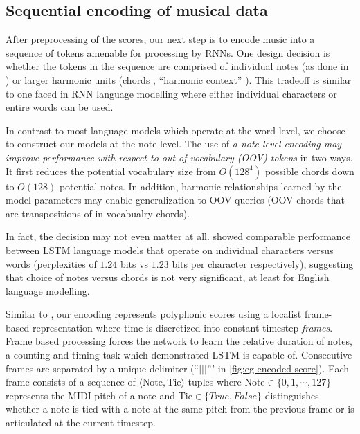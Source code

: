 \subsection{Sequential encoding of musical data}
\label{sec:sequential-encoding}


After preprocessing of the scores, our next step is to encode music into a
sequence of tokens amenable for processing by RNNs. One design decision is
whether the tokens in the sequence are comprised of individual notes (as done
in \citep{mozer1994neural,franklin2004recurrent,sturm2016music}) or larger
harmonic units (\eg chords \citep{Eck2002,Boulanger-Lewandowski2012},
``harmonic context'' \citep{Allan2005}). This tradeoff is similar to one faced
in RNN language modelling where either individual characters or entire words
can be used.

In contrast to most language models which operate at the word level, we choose
to construct our models at the note level. The use of \emph{a note-level encoding may
improve performance with respect to out-of-vocabulary (OOV) tokens} in two ways.
It first reduces the potential vocabulary size from $O(128^4)$ possible chords
down to $O(128)$ potential notes. In addition, harmonic relationships learned
by the model parameters may enable generalization to OOV queries (\eg OOV
chords that are transpositions of in-vocabualry chords).

In fact, the decision may not even matter at all. \citet{graves2013generating}
showed comparable performance between LSTM language models that operate on
individual characters versus words (perplexities of $1.24$ bits vs $1.23$ bits
per character respectively), suggesting that choice of notes versus chords is not
very significant, at least for English language modelling.

Similar to \citep{todd1989connectionist}, our encoding represents polyphonic
scores using a localist frame-based representation where time is discretized
into constant timestep \emph{frames}. Frame based processing forces the network
to learn the relative duration of notes, a counting and timing task which
\citep{gers2002learning} demonstrated LSTM is capable of. Consecutive frames
are separated by a unique delimiter (``$|||$''' in
\vref{fig:eg-encoded-score}). Each frame consists of a sequence of $\langle
\text{Note}, \text{Tie} \rangle$ tuples where $\text{Note} \in
\{0,1,\cdots,127\}$ represents the MIDI pitch of a note and $\text{Tie} \in
\{True,False\}$ distinguishes whether a note is tied with a note at the same
pitch from the previous frame or is articulated at the current timestep.

